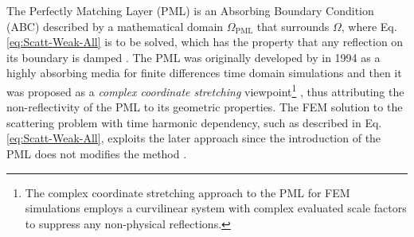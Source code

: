     The Perfectly Matching Layer (PML) is an Absorbing Boundary Condition (ABC) described by a mathematical  domain $\Omega_\text{PML}$ \cite{jin_theory_2010} that surrounds  $\Omega$, where Eq. \eqref{eq:Scatt-Weak-All} is to be solved, which has the property that any reflection on its boundary is damped \cite{bondeson_computational_2005,jin_theory_2010,chew_complex_1997}. The PML was originally developed by \citeauthor{berenger_perfectly_1994} \cite{berenger_perfectly_1994} in 1994 as a highly absorbing media for finite differences time domain simulations and then it was proposed as a \textit{complex coordinate stretching} viewpoint\footnote{The complex coordinate stretching approach to the PML for FEM simulations employs a curvilinear system with complex evaluated scale factors to suppress any non-physical reflections.} \cite{chew_complex_1997}, thus attributing the non-reflectivity of the PML to its geometric properties. The FEM solution to the scattering problem with time harmonic dependency, such as described in Eq. \eqref{eq:Scatt-Weak-All}, exploits the later approach since the introduction of the PML does not modifies the method \cite{jin_theory_2010}.

